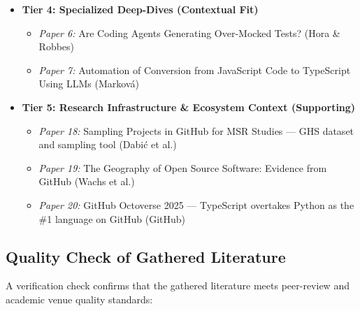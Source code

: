 \documentclass[11pt,a4paper]{article}
\begin{document}
\begin{itemize}
    \item \textbf{Tier 4: Specialized Deep-Dives (Contextual Fit)}
    \begin{itemize}
        \item \textit{Paper 6:} Are Coding Agents Generating Over-Mocked Tests? (Hora \& Robbes)
        \item \textit{Paper 7:} Automation of Conversion from JavaScript Code to TypeScript Using LLMs (Markov\'{a})
    \end{itemize}

    \item \textbf{Tier 5: Research Infrastructure \& Ecosystem Context (Supporting)}
    \begin{itemize}
        \item \textit{Paper 18:} Sampling Projects in GitHub for MSR Studies --- GHS dataset and sampling tool (Dabi\'{c} et al.)
        \item \textit{Paper 19:} The Geography of Open Source Software: Evidence from GitHub (Wachs et al.)
        \item \textit{Paper 20:} GitHub Octoverse 2025 --- TypeScript overtakes Python as the \#1 language on GitHub (GitHub)
    \end{itemize}
\end{itemize}

\subsection{Quality Check of Gathered Literature}
A verification check confirms that the gathered literature meets peer-review and academic venue quality standards:
\end{document}
